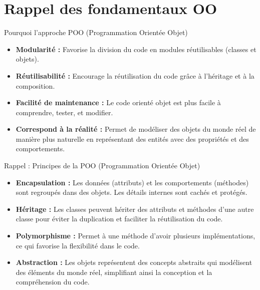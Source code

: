 \documentclass[aspectratio=169]{beamer}
\begin{document}
\section{Rappel des fondamentaux OO}
    \begin{frame}{Pourquoi l'approche POO (Programmation Orientée Objet)}
        \begin{itemize}
            \item \textbf{Modularité :} Favorise la division du code en modules réutilisables (classes et objets).
            \item \textbf{Réutilisabilité :} Encourage la réutilisation du code grâce à l'héritage et à la composition.
            \item \textbf{Facilité de maintenance :} Le code orienté objet est plus facile à comprendre, tester, et modifier.
            \item \textbf{Correspond à la réalité :} Permet de modéliser des objets du monde réel de manière plus naturelle en représentant des entités avec des propriétés et des comportements.
        \end{itemize}
    \end{frame}

    \begin{frame}{Rappel : Principes de la POO (Programmation Orientée Objet)}
        \begin{itemize}
            \item \textbf{Encapsulation :} Les données (attributs) et les comportements (méthodes) sont regroupés dans des objets. Les détails internes sont cachés et protégés.
            \item \textbf{Héritage :} Les classes peuvent hériter des attributs et méthodes d'une autre classe pour éviter la duplication et faciliter la réutilisation du code.
            \item \textbf{Polymorphisme :} Permet à une méthode d’avoir plusieurs implémentations, ce qui favorise la flexibilité dans le code.
            \item \textbf{Abstraction :} Les objets représentent des concepts abstraits qui modélisent des éléments du monde réel, simplifiant ainsi la conception et la compréhension du code.
        \end{itemize}
    \end{frame}
\end{document}
